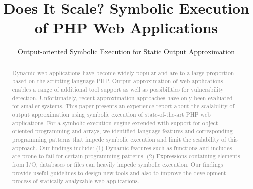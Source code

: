 \documentclass[sigconf]{acmart}
\begin{document}
\title{Does It Scale? Symbolic Execution of PHP Web Applications}
\subtitle{Output-oriented Symbolic Execution for Static Output Approximation}


\affiliation{%
}

\affiliation{%
}

\affiliation{%
}


\renewcommand{\shortauthors}{
}


\begin{abstract}
\textcolor{gray}{
Dynamic web applications have become widely popular and are to
a large proportion based on the scripting language PHP. Output approximation of web
applications enables a range of additional tool support as well as possibilities
for vulnerability detection. Unfortunately, recent approximation approaches have
only been evaluated for smaller systems.}
\textcolor{gray}{This paper presents an experience report about the scalability of output
approximation using symbolic execution of state-of-the-art PHP web
applications. For a symbolic execution engine extended with support for
object-oriented programming and arrays, we identified language features and
corresponding programming patterns that impede symbolic execution and limit the
scalability of this approach. Our findings include: (1) Dynamic features such as
functions and includes are prone to fail for certain programming patterns. (2)
Expressions containing elements from I/O, databases or files can heavily impede
symbolic execution. Our findings provide useful guidelines to design new
tools and also to improve the development process of statically analyzable web
applications.}
\end{abstract}
\end{document}
